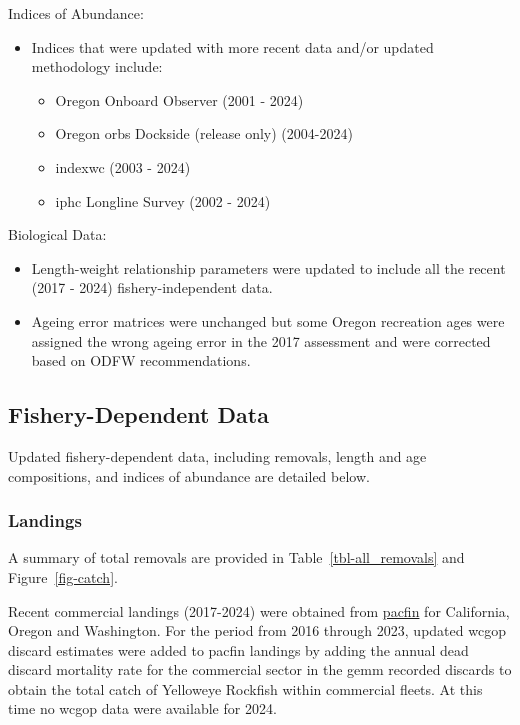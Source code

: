 \documentclass[
]{scrartcl}
\providecommand{\tightlist}{%
  \setlength{\itemsep}{0pt}\setlength{\parskip}{0pt}}\usepackage{longtable,booktabs,array}
\begin{document}
Indices of Abundance:

\begin{itemize}
\tightlist
\item
  Indices that were updated with more recent data and/or updated
  methodology include:

  \begin{itemize}
  \tightlist
  \item
    Oregon Onboard Observer (2001 - 2024)
  \item
    Oregon \gls{orbs} Dockside (release only) (2004-2024)
  \item
    \gls{indexwc} (2003 - 2024)
  \item
    \gls{iphc} Longline Survey (2002 - 2024)
  \end{itemize}
\end{itemize}

Biological Data:

\begin{itemize}
\tightlist
\item
  Length-weight relationship parameters were updated to include all the
  recent (2017 - 2024) fishery-independent data.
\item
  Ageing error matrices were unchanged but some Oregon recreation ages
  were assigned the wrong ageing error in the 2017 assessment and were
  corrected based on ODFW recommendations.
\end{itemize}

\subsection{Fishery-Dependent Data}\label{fishery-dependent-data}

Updated fishery-dependent data, including removals, length and age
compositions, and indices of abundance are detailed below.

\subsubsection{Landings}\label{landings}

A summary of total removals are provided in Table~\ref{tbl-all_removals}
and Figure~\ref{fig-catch}.

Recent commercial landings (2017-2024) were obtained from
\href{www.pacfin.psmfc.org}{\gls{pacfin}} for California, Oregon and
Washington. For the period from 2016 through 2023, updated \gls{wcgop}
discard estimates were added to \gls{pacfin} landings by adding the
annual dead discard mortality rate for the commercial sector in the
\gls{gemm} recorded discards to obtain the total catch of Yelloweye
Rockfish within commercial fleets. At this time no \gls{wcgop} data were
available for 2024.
\end{document}
